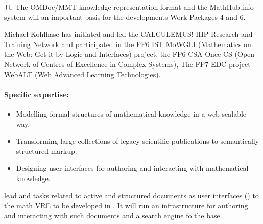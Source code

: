 \begin{sitedescription}{JU}
The \textsf{OMDoc/MMT} knowledge representation format and the \textsf{MathHub.info}
system will an important basis for the developments Work Packages 4 and 6.

Michael Kohlhase has initiated and led the CALCULEMUS! IHP-Research and Training Network
and participated in the FP6 IST MoWGLI (Mathematics on the Web: Get it by Logic and
Interfaces) project, the FP6 CSA Once-CS (Open Network of Centres of Excellence in Complex
Systems), The FP7 EDC project WebALT (Web Advanced Learning Technologies).

\paragraph{Specific expertise:}
\begin{itemize}
\item Modelling formal structures of mathematical knowledge in a web-scalable way.
\item Transforming large collections of legacy scientific publications to semantically
  structured markup.
\item Designing user interfaces for authoring and interacting with mathematical knowledge.
\end{itemize}

 lead  and tasks related to active and structured documents as
user interfaces () to the math VRE to be developed in \TheProject. It will run
an infrastructure for authoring and interacting with such documents and a search engine fo
the \DKS base. 
\end{sitedescription}


